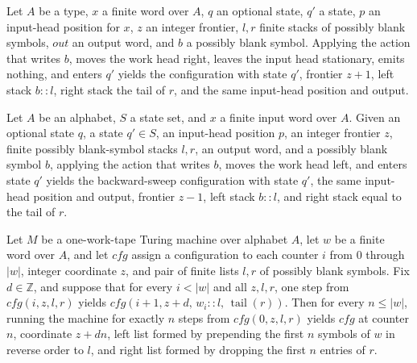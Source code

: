 \begin{lemma}
\label{Turing.FinTM.sweepCfg_right_any}
\leanok
{}
Let $A$ be a type, $x$ a finite word over $A$, $q$ an optional state, $q'$ a state, $p$
an input-head position for $x$, $z$ an integer frontier, $l,r$ finite stacks of possibly
blank symbols, $out$ an output word, and $b$ a possibly blank symbol. Applying the
action that writes $b$, moves the work head right, leaves the input head stationary,
emits nothing, and enters $q'$ yields the configuration with state $q'$, frontier $z+1$,
left stack $b::l$, right stack the tail of $r$, and the same input-head position and
output.
\end{lemma}

\begin{lemma}
\label{Turing.FinTM.sweepRevCfg_left_any}
\leanok
{}
Let $A$ be an alphabet, $S$ a state set, and $x$ a finite input word over $A$. Given an
optional state $q$, a state $q'\in S$, an input-head position $p$, an integer frontier
$z$, finite possibly blank-symbol stacks $l,r$, an output word, and a possibly blank
symbol $b$, applying the action that writes $b$, moves the work head left, and enters
state $q'$ yields the backward-sweep configuration with state $q'$, the same input-head
position and output, frontier $z-1$, left stack $b::l$, and right stack equal to the
tail of $r$.
\end{lemma}

\begin{lemma}
\label{Turing.FinTM.sweep_generate}
\leanok
{}
Let $M$ be a one-work-tape Turing machine over alphabet $A$, let $w$ be a finite word
over $A$, and let $\mathit{cfg}$ assign a configuration to each counter $i$ from $0$
through $|w|$, integer coordinate $z$, and pair of finite lists $l,r$ of possibly blank
symbols. Fix $d\in\mathbb{Z}$, and suppose that for every $i<|w|$ and all $z,l,r$, one
step from $\mathit{cfg}(i,z,l,r)$ yields
$\mathit{cfg}(i+1,z+d,\,w_i::l,\,\operatorname{tail}(r))$. Then for every $n\leq |w|$,
running the machine for exactly $n$ steps from $\mathit{cfg}(0,z,l,r)$ yields
$\mathit{cfg}$ at counter $n$, coordinate $z+dn$, left list formed by prepending the
first $n$ symbols of $w$ in reverse order to $l$, and right list formed by dropping the
first $n$ entries of $r$.
\end{lemma}

